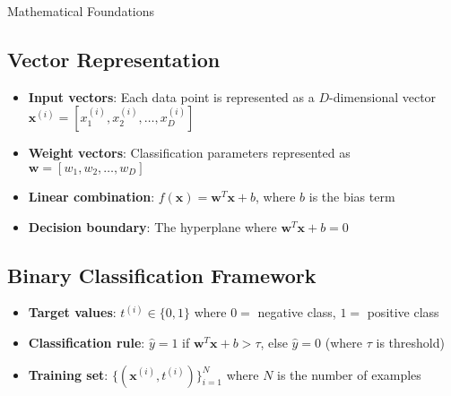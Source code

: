 \begin{fundasblock}{Mathematical Foundations}
\subsection{Vector Representation}
\begin{itemize}
    \item \textbf{Input vectors}: Each data point is represented as a $D$-dimensional vector $\bm{x}^{(i)} = [x_1^{(i)}, x_2^{(i)}, \ldots, x_D^{(i)}]$
    \item \textbf{Weight vectors}: Classification parameters represented as $\bm{w} = [w_1, w_2, \ldots, w_D]$
    \item \textbf{Linear combination}: $f(\bm{x}) = \bm{w}^T\bm{x} + b$, where $b$ is the bias term
    \item \textbf{Decision boundary}: The hyperplane where $\bm{w}^T\bm{x} + b = 0$
\end{itemize}

\subsection{Binary Classification Framework}
\begin{itemize}
    \item \textbf{Target values}: $t^{(i)} \in \{0, 1\}$ where $0 =$ negative class, $1 =$ positive class
    \item \textbf{Classification rule}: $\hat{y} = 1$ if $\bm{w}^T\bm{x} + b > \tau$, else $\hat{y} = 0$ (where $\tau$ is threshold)
    \item \textbf{Training set}: $\{(\bm{x}^{(i)}, t^{(i)})\}_{i=1}^N$ where $N$ is the number of examples
\end{itemize}
\end{fundasblock}

